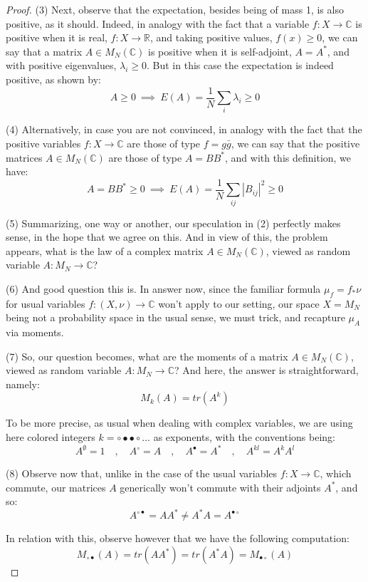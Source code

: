 \documentclass[12pt]{amsbook}
\begin{document}
\begin{proof}
\medskip

(3) Next, observe that the expectation, besides being of mass 1, is also positive, as it should. Indeed, in analogy with the fact that a variable $f:X\to\mathbb C$ is positive when it is real, $f:X\to\mathbb R$, and taking positive values, $f(x)\geq0$, we can say that a matrix $A\in M_N(\mathbb C)$ is positive when it is self-adjoint, $A=A^*$, and with positive eigenvalues, $\lambda_i\geq0$. But in this case the expectation is indeed positive, as shown by:
$$A\geq 0\ \implies\ E(A)=\frac{1}{N}\sum_i\lambda_i\geq0$$

(4) Alternatively, in case you are not convinced, in analogy with the fact that the positive variables $f:X\to\mathbb C$ are those of type $f=g\bar{g}$, we can say that the positive matrices $A\in M_N(\mathbb C)$ are those of type $A=BB^*$, and with this definition, we have:
$$A=BB^*\geq 0\ \implies\ E(A)=\frac{1}{N}\sum_{ij}|B_{ij}|^2\geq0$$

(5) Summarizing, one way or another, our speculation in (2) perfectly makes sense, in the hope that we agree on this. And in view of this, the problem appears, what is the law of a complex matrix $A\in M_N(\mathbb C)$, viewed as random variable $A:M_N\to\mathbb C$? 

\medskip

(6) And good question this is. In answer now, since the familiar formula $\mu_f=f_*\nu$ for usual variables $f:(X,\nu)\to\mathbb C$ won't apply to our setting, our space $X=M_N$ being not a probability space in the usual sense, we must trick, and recapture $\mu_A$ via moments.

\medskip

(7) So, our question becomes, what are the moments of a matrix $A\in M_N(\mathbb C)$, viewed as random variable $A:M_N\to\mathbb C$? And here, the answer is straightforward, namely:
$$M_k(A)=tr(A^k)$$

To be more precise, as usual when dealing with complex variables, we are using here colored integers $k=\circ\bullet\bullet\circ\ldots$ as exponents, with the conventions being:
$$A^\emptyset=1\quad,\quad A^\circ=A\quad,\quad A^\bullet=A^*\quad,\quad A^{kl}=A^kA^l$$

(8) Observe now that, unlike in the case of the usual variables $f:X\to\mathbb C$, which commute, our matrices $A$ generically won't commute with their adjoints $A^*$, and so:
$$A^{\circ\bullet}=AA^*\neq A^*A=A^{\bullet\circ}$$

In relation with this, observe however that we have the following computation:
$$M_{\circ\bullet}(A)=tr(AA^*)=tr(A^*A)=M_{\bullet\circ}(A)$$


\end{proof}
\end{document}
